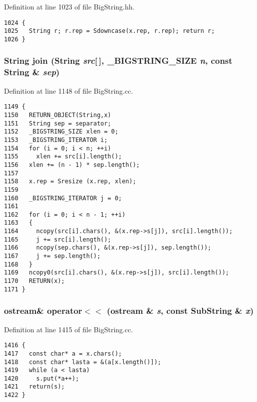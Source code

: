 Definition at line 1023 of file Big\-String.hh.



\footnotesize\begin{verbatim}1024 {
1025   String r; r.rep = Sdowncase(x.rep, r.rep); return r;
1026 }
\end{verbatim}\normalsize 
{}
\subsubsection{\setlength{\rightskip}{0pt plus 5cm}String join (String {\em src}[$\,$], {\bf \_\-BIGSTRING\_\-SIZE} {\em n}, const String \& {\em sep})\hspace{0.3cm}{\tt  [friend]}}\label{classString_l43}




Definition at line 1148 of file Big\-String.cc.



\footnotesize\begin{verbatim}1149 {
1150   RETURN_OBJECT(String,x)
1151   String sep = separator;
1152   _BIGSTRING_SIZE xlen = 0;
1153   _BIGSTRING_ITERATOR i;
1154   for (i = 0; i < n; ++i)
1155     xlen += src[i].length();
1156   xlen += (n - 1) * sep.length();
1157 
1158   x.rep = Sresize (x.rep, xlen);
1159 
1160   _BIGSTRING_ITERATOR j = 0;
1161   
1162   for (i = 0; i < n - 1; ++i)
1163   {
1164     ncopy(src[i].chars(), &(x.rep->s[j]), src[i].length());
1165     j += src[i].length();
1166     ncopy(sep.chars(), &(x.rep->s[j]), sep.length());
1167     j += sep.length();
1168   }
1169   ncopy0(src[i].chars(), &(x.rep->s[j]), src[i].length());
1170   RETURN(x);
1171 }
\end{verbatim}\normalsize 
{}
\subsubsection{\setlength{\rightskip}{0pt plus 5cm}ostream\& operator$<$$<$ (ostream \& {\em s}, const {\bf Sub\-String} \& {\em x})\hspace{0.3cm}{\tt  [friend]}}\label{classString_l49}




Definition at line 1415 of file Big\-String.cc.



\footnotesize\begin{verbatim}1416 { 
1417   const char* a = x.chars();
1418   const char* lasta = &(a[x.length()]);
1419   while (a < lasta)
1420     s.put(*a++);
1421   return(s);
1422 }
\end{verbatim}\normalsize 
{}
